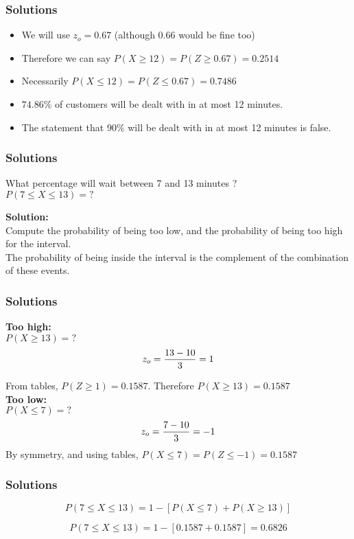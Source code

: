 \documentclass[a4]{beamer}
\begin{document}
\begin{frame}
\frametitle{Solutions}
\begin{itemize}
\item We will use $z_o =0.67$ (although 0.66 would be fine too) 
\item Therefore we can say $P(X \geq 12 ) = P(Z \geq 0.67)  = 0.2514$
\item Necessarily  $P(X \leq 12 ) = P(Z \leq 0.67) = 0.7486$
\item $74.86\%$ of customers will be dealt with in at most 12 minutes.
\item The statement that $90\%$ will be dealt with in at most 12 minutes is false.
\end{itemize}
\end{frame}
\begin{frame}
\frametitle{Solutions}
What percentage will wait between 7 and 13 minutes ?\\

$P(7 \leq X \leq 13)   = ?$

\textbf{Solution:}\\
Compute the probability of being too low, and the probability of being too high for the interval.\\The probability of being inside the interval is the complement of the combination of these events.
\end{frame}
\begin{frame}
\frametitle{Solutions}
\textbf{Too high:}\\
$P(X \geq 13) = ?$
\[ z_o  = {13 - 10  \over 3} = 1\]

From tables, $P(Z \geq 1) = 0.1587$. Therefore $P(X \geq 13) = 0.1587$\\ \bigskip
\textbf{Too low:}\\
$P(X \leq 7) = ?$
\[ z_o  = {7 - 10  \over 3} = -1\]
By symmetry, and using tables, $P(X \leq 7) = P(Z \leq -1)= 0.1587$\\ \bigskip
\end{frame}
\begin{frame}
\frametitle{Solutions}

\[P(7 \leq X \leq 13)  = 1 - [ P(X \leq 7)  + P(X \geq 13) ] \]

\[P(7 \leq X \leq 13)  =  1 - [0.1587+0.1587] = 0.6826\]

\end{frame}
\end{document}
